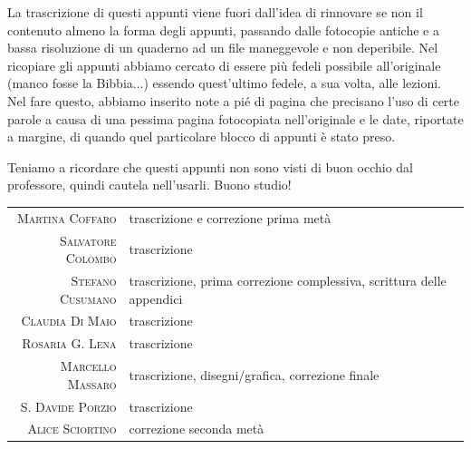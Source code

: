 La trascrizione di questi appunti viene fuori dall'idea di rinnovare se non il
contenuto almeno la forma degli appunti, passando dalle fotocopie antiche e a
bassa risoluzione di un quaderno ad un file maneggevole e non deperibile. Nel
ricopiare gli appunti abbiamo cercato di essere più fedeli possibile all'originale
(manco fosse la Bibbia...) essendo quest'ultimo fedele, a sua volta, alle lezioni.
Nel fare questo, abbiamo inserito note a pié di pagina che precisano l'uso di
certe parole a causa di una pessima pagina fotocopiata nell'originale e le date,
riportate a margine, di quando quel particolare blocco di appunti è stato preso.

Teniamo a ricordare che questi appunti non sono visti di buon occhio dal
professore, quindi cautela nell'usarli. Buono studio!

\vfill
\begin{tabularx}{0.75\textwidth}{>{\scshape}rX}
  Martina Coffaro   & trascrizione e correzione prima metà\\
  Salvatore Colombo & trascrizione\\
  Stefano Cusumano  & trascrizione, prima correzione complessiva,
                      scrittura delle appendici\\
  Claudia Di Maio   & trascrizione\\
  Rosaria G. Lena   & trascrizione\\
  Marcello Massaro  & trascrizione, disegni/grafica, correzione
                      finale\\
  S. Davide Porzio  & trascrizione\\
  Alice Sciortino   & correzione seconda metà
\end{tabularx}
\vfill
